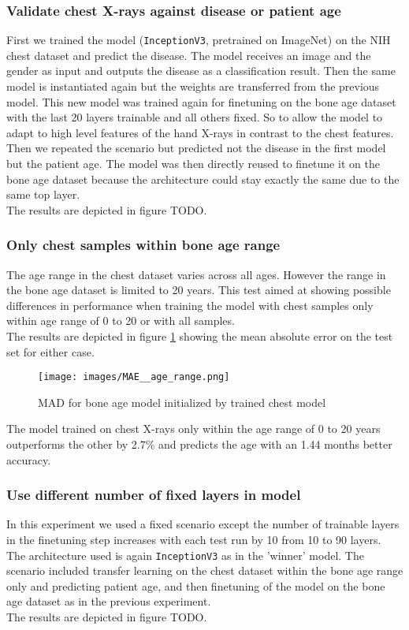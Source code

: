 \documentclass[10pt,twocolumn,letterpaper]{article}
\begin{document}
\subsubsection{Validate chest X-rays against disease or patient age}
First we trained the model (\verb+InceptionV3+, pretrained on ImageNet) on the NIH chest dataset and predict the disease. The model receives an image and the gender as input and outputs the disease as a classification result. Then the same model is instantiated again but the weights are transferred from the previous model. This new model was trained again for finetuning on the bone age dataset with the last 20 layers trainable and all others fixed. So to allow the model to adapt to high level features of the hand X-rays in contrast to the chest features.\\
Then we repeated the scenario but predicted not the disease in the first model but the patient age. The model was then directly reused to finetune it on the bone age dataset because the architecture could stay exactly the same due to the same top layer.\\
The results are depicted in figure TODO.


\subsubsection{Only chest samples within bone age range}
The age range in the chest dataset varies across all ages. However the range in the bone age dataset is limited to 20 years. This test aimed at showing possible differences in performance when training the model with chest samples only within age range of 0 to 20 or with all samples.\\
The results are depicted in figure \ref{fig:maeagerange} showing the mean absolute error on the test set for either case.

\begin{figure}[h]
\texttt{[image: images/MAE\_\_age\_range.png]}
\centering
\caption{MAD for bone age model initialized by trained chest model }
\label{fig:maeagerange}
\end{figure}

The model trained on chest X-rays only within the age range of 0 to 20 years outperforms the other by 2.7\% and predicts the age with an 1.44 months better accuracy.

\subsubsection{Use different number of fixed layers in model}
In this experiment we used a fixed scenario except the number of trainable layers in the finetuning step increases with each test run by 10 from 10 to 90 layers. The architecture used is again \verb+InceptionV3+ as in the 'winner' model. The scenario included transfer learning on the chest dataset within the bone age range only and predicting patient age, and then finetuning of the model on the bone age dataset as in the previous experiment.\\
The results are depicted in figure TODO.
\end{document}
